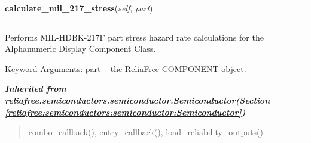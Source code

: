     \vspace{0.5ex}

\hspace{.8\funcindent}\begin{boxedminipage}{\funcwidth}

    \raggedright \textbf{calculate\_mil\_217\_stress}(\textit{self}, \textit{part})

    \vspace{-1.5ex}

    \rule{\textwidth}{0.5\fboxrule}
\setlength{\parskip}{2ex}
    Performs MIL-HDBK-217F part stress hazard rate calculations for the 
    Alphanumeric Display Component Class.

    Keyword Arguments: part -- the ReliaFree COMPONENT object.

\setlength{\parskip}{1ex}
    \end{boxedminipage}


\large{\textbf{\textit{Inherited from reliafree.semiconductors.semiconductor.Semiconductor\textit{(Section \ref{reliafree:semiconductors:semiconductor:Semiconductor})}}}}

\begin{quote}
combo\_callback(), entry\_callback(), load\_reliability\_outputs()
\end{quote}
